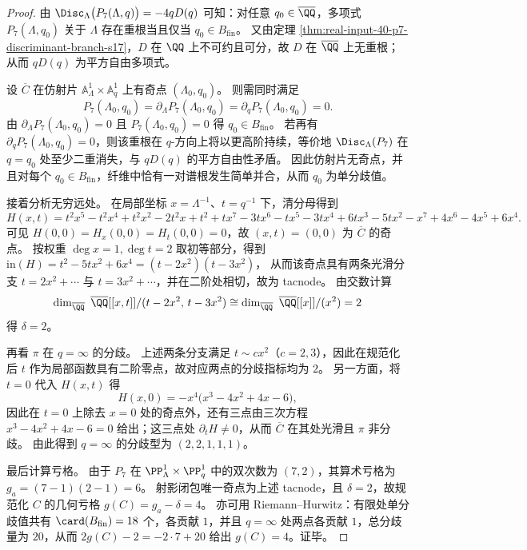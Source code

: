 \begin{proof}
由 \(\Disc_{\Lambda}\bigl(P_7(\Lambda,q)\bigr)=-4qD(q)\) 可知：对任意 \(q_0\in\overline{\QQ}\)，多项式 \(P_7(\Lambda,q_0)\) 关于 \(\Lambda\) 存在重根当且仅当 \(q_0\in B_{\mathrm{fin}}\)。
又由定理 \ref{thm:real-input-40-p7-discriminant-branch-s17}，\(D\) 在 \(\QQ\) 上不可约且可分，故 \(D\) 在 \(\overline{\QQ}\) 上无重根；从而 \(qD(q)\) 为平方自由多项式。
\par
设 \(\overline C\) 在仿射片 \(\mathbb{A}^1_{\Lambda}\times\mathbb{A}^1_{q}\) 上有奇点 \((\Lambda_0,q_0)\)。
则需同时满足
\[
P_7(\Lambda_0,q_0)=\partial_{\Lambda}P_7(\Lambda_0,q_0)=\partial_{q}P_7(\Lambda_0,q_0)=0.
\]
由 \(\partial_{\Lambda}P_7(\Lambda_0,q_0)=0\) 且 \(P_7(\Lambda_0,q_0)=0\) 得 \(q_0\in B_{\mathrm{fin}}\)。
若再有 \(\partial_{q}P_7(\Lambda_0,q_0)=0\)，则该重根在 \(q\)-方向上将以更高阶持续，等价地 \(\Disc_{\Lambda}(P_7)\) 在 \(q=q_0\) 处至少二重消失，与 \(qD(q)\) 的平方自由性矛盾。
因此仿射片无奇点，并且对每个 \(q_0\in B_{\mathrm{fin}}\)，纤维中恰有一对谱根发生简单并合，从而 \(q_0\) 为单分歧值。
\par
接着分析无穷远处。
在局部坐标 \(x=\Lambda^{-1}\)、\(t=q^{-1}\) 下，清分母得到
\[
H(x,t)=t^{2}x^{5}-t^{2}x^{4}+t^{2}x^{2}-2t^{2}x+t^{2}+t x^{7}-3t x^{6}-t x^{5}-3t x^{4}+6t x^{3}-5t x^{2}-x^{7}+4x^{6}-4x^{5}+6x^{4}.
\]
可见 \(H(0,0)=H_x(0,0)=H_t(0,0)=0\)，故 \((x,t)=(0,0)\) 为 \(\overline C\) 的奇点。
按权重 \(\deg x=1,\deg t=2\) 取初等部分，得到
\(
\mathrm{in}(H)=t^{2}-5tx^{2}+6x^{4}=(t-2x^{2})(t-3x^{2})
\)，
从而该奇点具有两条光滑分支 \(t=2x^{2}+\cdots\) 与 \(t=3x^{2}+\cdots\)，并在二阶处相切，故为 tacnode。
由交数计算
\[
\dim_{\overline{\QQ}}\ \overline{\QQ}[[x,t]]/(t-2x^{2},\,t-3x^{2})
\cong
\dim_{\overline{\QQ}}\ \overline{\QQ}[[x]]/(x^{2})=2
\]
得 \(\delta=2\)。
\par
再看 \(\pi\) 在 \(q=\infty\) 的分歧。
上述两条分支满足 \(t\sim c x^{2}\)（\(c=2,3\)），因此在规范化后 \(t\) 作为局部函数具有二阶零点，故对应两点的分歧指标均为 \(2\)。
另一方面，将 \(t=0\) 代入 \(H(x,t)\) 得
\[
H(x,0)=-x^{4}\bigl(x^{3}-4x^{2}+4x-6\bigr),
\]
因此在 \(t=0\) 上除去 \(x=0\) 处的奇点外，还有三点由三次方程 \(x^{3}-4x^{2}+4x-6=0\) 给出；这三点处 \(\partial_t H\neq 0\)，从而 \(\overline C\) 在其处光滑且 \(\pi\) 非分歧。
由此得到 \(q=\infty\) 的分歧型为 \((2,2,1,1,1)\)。
\par
最后计算亏格。
由于 \(P_7\) 在 \(\PP^1_{\Lambda}\times\PP^1_q\) 中的双次数为 \((7,2)\)，其算术亏格为
\(
g_a=(7-1)(2-1)=6
\)。
射影闭包唯一奇点为上述 tacnode，且 \(\delta=2\)，故规范化 \(C\) 的几何亏格
\(
g(C)=g_a-\delta=4
\)。
亦可用 Riemann--Hurwitz：有限处单分歧值共有 \(\card(B_{\mathrm{fin}})=18\) 个，各贡献 \(1\)，并且 \(q=\infty\) 处两点各贡献 \(1\)，总分歧量为 \(20\)，从而
\(
2g(C)-2=-2\cdot 7+20
\) 给出 \(g(C)=4\)。证毕。
\end{proof}


